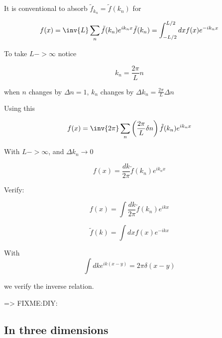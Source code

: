 It is conventional to absorb $\tilde{f}_{k_n} = \tilde{f}(k_n)$ for

\begin{equation}\label{eqn:relativisticElectrodynamicsL15:n}
f(x) = \inv{L} \sum_n \tilde{f}(k_n) e^{i k_n x}
\tilde{f}(k_n) = \int_{-L/2}^{L/2} dx f(x) e^{-i k_n x}
\end{equation}

To take $L -> \infty$ notice

\begin{equation}\label{eqn:relativisticElectrodynamicsL15:n}
k_n = \frac{2 \pi}{L} n
\end{equation}

when $n$ changes by $\Delta n = 1$, $k_n$ changes by $\Delta k_n = \frac{2 \pi}{L} \Delta n$

Using this 

\begin{equation}\label{eqn:relativisticElectrodynamicsL15:n}
f(x) = \inv{2\pi} \sum_n \left( \frac{2\pi}{L} \delta n \right) \tilde{f}(k_n) e^{i k_n x}
\end{equation}

With $L -> \infty$, and $\Delta k_n \rightarrow 0$

\begin{equation}\label{eqn:relativisticElectrodynamicsL15:n}
f(x) = \frac{dk}{2\pi} \tilde{f}(k_n) e^{i k_n x}
\end{equation}

Verify:

\begin{equation}\label{eqn:relativisticElectrodynamicsL15:n}
f(x) = \int \frac{dk}{2\pi} \tilde{f}(k_n) e^{i k x}
\end{equation}

\begin{equation}\label{eqn:relativisticElectrodynamicsL15:n}
\tilde{f}(k) = \int dx f(x) e^{-i k x}
\end{equation}

With
\begin{equation}\label{eqn:relativisticElectrodynamicsL15:n}
\int dk e^{i k (x - y)} = 2 \pi \delta(x - y)
\end{equation}

we verify the inverse relation.

=> FIXME:DIY:

\subsection{In three dimensions}

